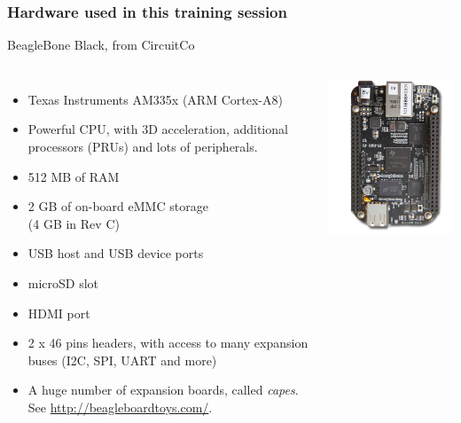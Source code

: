\begin{frame}
\frametitle{Hardware used in this training session}
  BeagleBone Black, from CircuitCo
  \begin{columns}
    \footnotesize
    \begin{itemize}
      \item Texas Instruments AM335x (ARM Cortex-A8)
      \item Powerful CPU, with 3D acceleration, additional processors
        (PRUs) and lots of peripherals.
      \item 512 MB of RAM
      \item 2 GB of on-board eMMC storage\\
            (4 GB in Rev C)
      \item USB host and USB device ports
      \item microSD slot
      \item HDMI port
      \item 2 x 46 pins headers, with access to many expansion buses
        (I2C, SPI, UART and more)
      \item A huge number of expansion boards, called {\em capes}.
        See \url{http://beagleboardtoys.com/}.
    \end{itemize}
    \includegraphics[width=\textwidth]{slides/beagleboneblack-board/beagleboneblack.png}
  \end{columns}
\end{frame}

